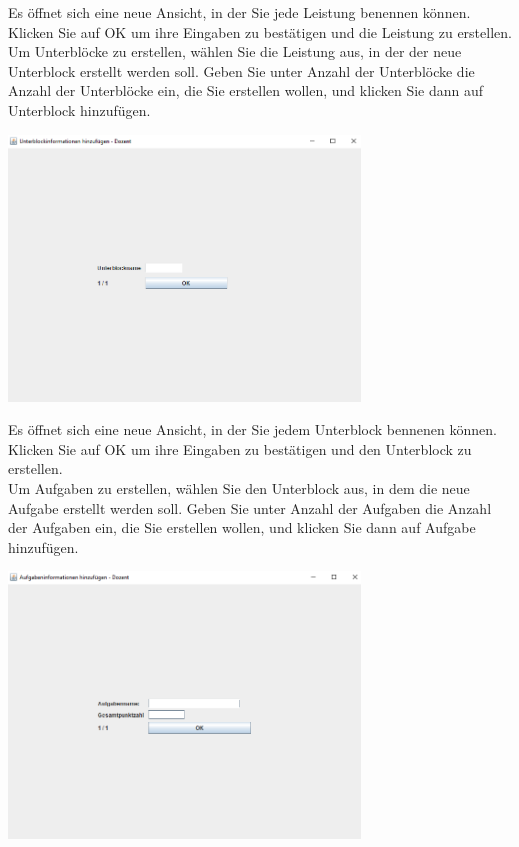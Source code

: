 \documentclass{Handbuch}
\begin{document}
Es öffnet sich eine neue Ansicht, in der Sie jede Leistung benennen können. Klicken Sie auf \frqq OK\flqq{} um ihre Eingaben zu bestätigen und die Leistung zu erstellen. \\
Um Unterblöcke zu erstellen, wählen Sie die Leistung aus, in der der neue Unterblock erstellt werden soll. Geben Sie unter \glqq Anzahl der Unterblöcke\grqq{} die Anzahl der Unterblöcke ein, die Sie erstellen wollen, und klicken Sie dann auf \frqq Unterblock hinzufügen\flqq. 
\begin{center}
	\includegraphics[width=0.7\textwidth]{img_DozentenGUI_17.png}
\end{center}
Es öffnet sich eine neue Ansicht, in der Sie jedem Unterblock bennenen können. Klicken Sie auf \frqq OK\flqq{} um ihre Eingaben zu bestätigen und den Unterblock zu erstellen. \\
Um Aufgaben zu erstellen, wählen Sie den Unterblock aus, in dem die neue Aufgabe erstellt werden soll. Geben Sie unter \glqq Anzahl der Aufgaben\grqq{} die Anzahl der Aufgaben ein, die Sie erstellen wollen, und klicken Sie dann auf \frqq Aufgabe hinzufügen\flqq. 
\begin{center}
	\includegraphics[width=0.7\textwidth]{img_DozentenGUI_18.png}
\end{center}
\end{document}
